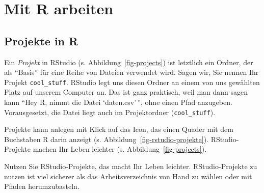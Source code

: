 \documentclass[
  letterpaper,
]{scrbook}
\theoremstyle{definition}
\theoremstyle{definition}
\theoremstyle{definition}
\theoremstyle{remark}
\begin{document}
\section{Mit R arbeiten}\label{mit-r-arbeiten}

\subsection{Projekte in R}\label{projekte-in-r}

Ein \emph{Projekt} in RStudio (s. Abbildung~\ref{fig-projects}) ist
letztlich ein Ordner, der als ``Basis'' für eine Reihe von Dateien
verwendet wird. Sagen wir, Sie nennen Ihr Projekt \texttt{cool\_stuff}.
RStudio legt uns diesen Ordner an einem von uns gewählten Platz auf
unserem Computer an. Das ist ganz praktisch, weil man dann sagen kann
``Hey R, nimmt die Datei `daten.csv'\,'', ohne einen Pfad anzugeben.
Vorausgesetzt, die Datei liegt auch im Projektordner
(\texttt{cool\_stuff}).

Projekte kann anlegen mit Klick auf das Icon, das einen Quader mit dem
Buchstaben R darin anzeigt (s. Abbildung~\ref{fig-rstudio-projekte}).
RStudio-Projekte machen Ihr Leben leichter (s.
Abbildung~\ref{fig-projects}).

Nutzen Sie RStudio-Projekte, das macht Ihr Leben leichter.
RStudio-Projekte zu nutzen ist viel sicherer als das Arbeitsverzeichnis
von Hand zu wählen oder mit Pfaden herumzubasteln.
\end{document}
